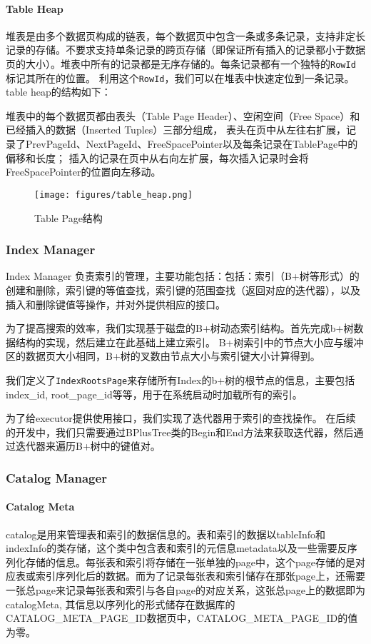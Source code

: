 \documentclass[12pt,hyperref,a4paper,UTF8]{ctexart}
\begin{document}
\paragraph{Table Heap}

堆表是由多个数据页构成的链表，每个数据页中包含一条或多条记录，支持非定长记录的存储。不要求支持单条记录的跨页存储（即保证所有插入的记录都小于数据页的大小）。堆表中所有的记录都是无序存储的。每条记录都有一个独特的\verb|RowId|标记其所在的位置。
利用这个\verb|RowId|，我们可以在堆表中快速定位到一条记录。table heap的结构如下：

堆表中的每个数据页都由表头（Table Page Header）、空闲空间（Free Space）和已经插入的数据（Inserted Tuples）三部分组成，
表头在页中从左往右扩展，记录了PrevPageId、NextPageId、FreeSpacePointer以及每条记录在TablePage中的偏移和长度；
插入的记录在页中从右向左扩展，每次插入记录时会将FreeSpacePointer的位置向左移动。

\begin{figure}[!ht]
    \centering
    \texttt{[image: figures/table\_heap.png]}
    \caption{Table Page结构}
    \label{fig:table_page}
\end{figure}

\subsubsection{Index Manager}

Index Manager 负责索引的管理，主要功能包括：包括：索引（B+树等形式）的创建和删除，索引键的等值查找，索引键的范围查找（返回对应的迭代器），以及插入和删除键值等操作，并对外提供相应的接口。

为了提高搜索的效率，我们实现基于磁盘的B+树动态索引结构。首先完成b+树数据结构的实现，然后建立在此基础上建立索引。
B+树索引中的节点大小应与缓冲区的数据页大小相同，B+树的叉数由节点大小与索引键大小计算得到。

我们定义了\verb|IndexRootsPage|来存储所有Index的b+树的根节点的信息，主要包括index\_id, root\_page\_id等等，用于在系统启动时加载所有的索引。

为了给executor提供使用接口，我们实现了迭代器用于索引的查找操作。
在后续的开发中，我们只需要通过BPlusTree类的Begin和End方法来获取迭代器，然后通过迭代器来遍历B+树中的键值对。

\subsubsection{Catalog Manager}

\paragraph{Catalog Meta}
catalog是用来管理表和索引的数据信息的。表和索引的数据以tableInfo和indexInfo的类存储，这个类中包含表和索引的元信息metadata以及一些需要反序列化存储的信息。每张表和索引将存储在一张单独的page中，这个page存储的是对应表或索引序列化后的数据。而为了记录每张表和索引储存在那张page上，还需要一张总page来记录每张表和索引与各自page的对应关系，这张总page上的数据即为catalogMeta,
其信息以序列化的形式储存在数据库的CATALOG\_META\_PAGE\_ID数据页中，CATALOG\_META\_PAGE\_ID的值为零。
\end{document}
